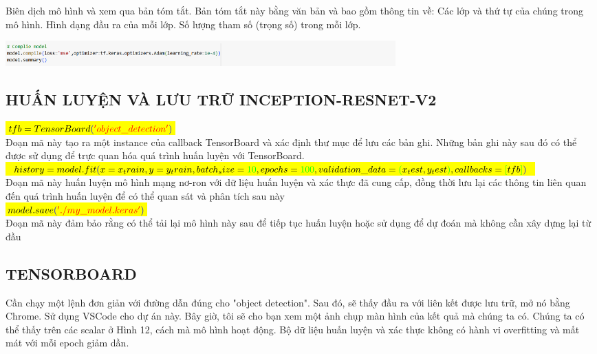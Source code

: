 \documentclass{article}
\begin{document}
Biên dịch mô hình và xem qua bản tóm tắt. Bản tóm tắt này bằng văn bản và bao gồm thông tin về: Các lớp và thứ tự của chúng trong mô hình. Hình dạng đầu ra của mỗi lớp. Số lượng tham số (trọng số) trong mỗi lớp.

\includegraphics[width = 15cm]{img/img1/Screenshot 2024-11-20 161219.png}

\subsection{HUẤN LUYỆN VÀ LƯU TRỮ INCEPTION-RESNET-V2}
\hspace{2cm} \hl{$tfb = TensorBoard\textcolor{blue}{(}\textcolor{red}{'object\_detection'}\textcolor{blue}{)}$} \\

Đoạn mã này tạo ra một instance của callback TensorBoard và xác định thư mục để lưu các bản ghi. Những bản ghi này sau đó có thể được sử dụng để trực quan hóa quá trình huấn luyện với TensorBoard. \\

\hl{$history = 
model.fit\textcolor{blue}{(}x=x_train,y=y_train,batch_size=\textcolor{green}{10},epochs=\textcolor{green}{100},validation\_data=\textcolor{green}{(}x_test,y_test\textcolor{green}{)},callbacks=\textcolor{green}{[}tfb\textcolor{green}{]}\textcolor{blue}{)}$} \\

Đoạn mã này huấn luyện mô hình mạng nơ-ron với dữ liệu huấn luyện và xác thực đã cung cấp, đồng thời lưu lại các thông tin liên quan đến quá trình huấn luyện để có thể quan sát và phân tích sau này \\ 

\hl{$model.save\textcolor{blue}{(}\textcolor{red}{'./my\_model.keras'}\textcolor{blue}{)}$} \\


Đoạn mã này đảm bảo rằng có thể tải lại mô hình này sau để tiếp tục huấn luyện hoặc sử dụng để dự đoán mà không cần xây dựng lại từ đầu


\subsection{TENSORBOARD}

Cần chạy một lệnh đơn giản với đường dẫn đúng cho "object detection". Sau đó, sẽ thấy đầu ra với liên kết được lưu trữ, mở nó bằng Chrome. Sử dụng VSCode cho dự án này. Bây giờ, tôi sẽ cho bạn xem một ảnh chụp màn hình của kết quả mà chúng ta có. Chúng ta có thể thấy trên các scalar ở Hình 12, cách mà mô hình hoạt động. Bộ dữ liệu huấn luyện và xác thực không có hành vi overfitting và mất mát với mỗi epoch giảm dần.
\end{document}
